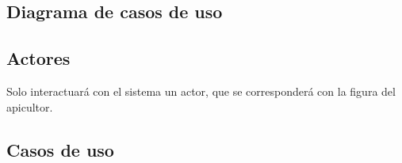 \begin{landscape}
\subsection{Diagrama de casos de uso}\label{diagrama-de-casos-de-uso}
\end{landscape}

\subsection{Actores}\label{actores}

Solo interactuará con el sistema un actor, que se corresponderá con la
figura del apicultor.

\subsection{Casos de uso}\label{casos-de-uso}

